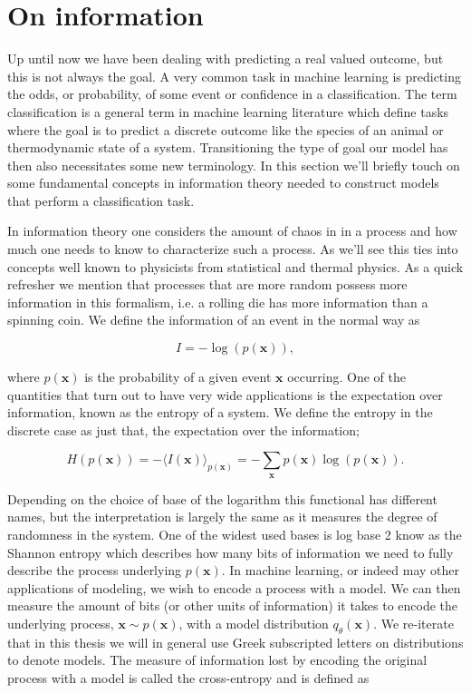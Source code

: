 
\section{On information}\label{sec:information}

Up until now we have been dealing with predicting a real valued outcome, but this is not always the goal. A very common task in machine learning is predicting the odds, or probability, of some event or confidence in a classification. The term classification is a general term in machine learning literature which define tasks where the goal is to predict a discrete outcome like the species of an animal or thermodynamic state of a system. Transitioning the type of goal our model has then also necessitates some new terminology. In this section we'll briefly touch on some fundamental concepts in information theory needed to construct models that perform a classification task.

In information theory one considers the amount of chaos in in a process and how much one needs to know to characterize such a process. As we'll see this ties into concepts well known to physicists from statistical and thermal physics. As a quick refresher we mention that processes that are more random possess more information in this formalism, i.e. a rolling die has more information than a spinning coin. We define the information of an event in the normal way as 

\begin{equation}
I = -\log(p(\mathbf{x})),
\end{equation} 

\noindent where $p(\mathbf{x})$ is the probability of a given event $\mathbf{x}$ occurring. One of the quantities that turn out to have very wide applications is the expectation over information, known as the entropy of a system. We define the entropy in the discrete case as just that, the expectation over the information;

\begin{equation}
H(p(\mathbf{x})) = -\langle I(\mathbf{x}) \rangle_{p(\mathbf{x})} = - \sum _\mathbf{x} p(\mathbf{x})\log(p(\mathbf{x})).
\end{equation}

\noindent Depending on the choice of base of the logarithm this functional has different names, but the interpretation is largely the same as it measures the degree of randomness in the system. One of the widest used bases is log base 2 know as the Shannon entropy which describes how many bits of information we need to fully describe the process underlying $p(\mathbf{x})$. In machine learning, or indeed may other applications of modeling, we wish to encode a process with a model. We can then measure the amount of bits (or other units of information) it takes to encode the underlying process, $\mathbf{x} \sim p(\mathbf{x})$, with a model distribution $q_{\theta}(\mathbf{\mathbf{x}})$. We re-iterate that in this thesis we will in general use Greek subscripted letters on distributions to denote models. The measure of information lost by encoding the original process with a model is called the cross-entropy and is defined as

